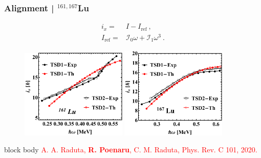 \documentclass{beamer}
\begin{document}
\begin{frame}
	\frametitle{Alignment | $^{161,167}$Lu}
	\vspace{-0.5cm}
	\begin{align}
		i_x=&I-I_\text{ref}\ ,\nonumber\\
		I_\text{ref}=&\mathcal{I}_0\omega+\mathcal{I}_1\omega^3\ .\nonumber
	\end{align}
	\vspace{-0.5cm}
	\begin{figure}
		\centering
		\includegraphics[width=0.45\textwidth]{figures/Lu-exp-energies/fig7.pdf}
		\includegraphics[width=0.45\textwidth]{figures/Lu-exp-energies/fig10.pdf}
	\end{figure}
	\begin{beamercolorbox}[rounded=true,shadow=false, wd=\linewidth,]{block body}
		\centering
		\textcolor{red}{\footnotesize{A. A. Raduta, \textbf{R. Poenaru}, C. M. Raduta, Phys. Rev. C 101, 2020.}}
	\end{beamercolorbox}
\end{frame}
\end{document}
